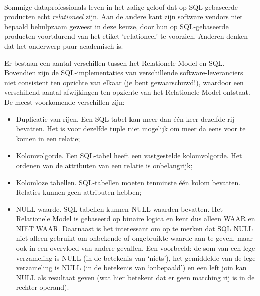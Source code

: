 \begin{aside}\mbox{}\\
Sommige dataprofessionals leven in het zalige geloof dat op SQL gebaseerde producten echt \textit{relationeel} zijn. Aan de andere kant zijn software vendors niet bepaald behulpzaam geweest in deze keuze, door hun op SQL-gebaseerde producten voortdurend van het etiket `relationeel' te voorzien. Anderen denken dat het onderwerp puur academisch is.

Er bestaan een aantal verschillen tussen het Relationele Model en SQL. Bovendien zijn de SQL-implementaties van verschillende software-leveranciers niet consistent ten opzichte van elkaar (je bent gewaarschuwd!), waardoor een verschillend aantal afwijkingen ten opzichte van het Relationele Model ontstaat. De meest voorkomende verschillen zijn:
\begin{itemize}
\item Duplicatie van rijen. Een SQL-tabel kan meer dan \'e\'en keer dezelfde rij bevatten. Het is voor dezelfde tuple niet mogelijk om meer da eens voor te komen in een relatie;
\item Kolomvolgorde. Een SQL-tabel heeft een vastgestelde kolomvolgorde. Het ordenen van de attributen van een relatie is onbelangrijk;
\item Kolomloze tabellen. SQL-tabellen moeten tenminste \'e\'en kolom bevatten. Relaties kunnen geen attributen hebben;
\item NULL-waarde. SQL-tabellen kunnen NULL-waarden bevatten. Het Relationele Model is gebaseerd op binaire logica en kent dus alleen WAAR en NIET WAAR. Daarnaast is het interessant om op te merken dat SQL NULL niet alleen gebruikt om onbekende of ongebruikte waarde aan te geven, maar ook in een overvloed van andere gevallen. Een voorbeeld: de som van een lege verzameling is NULL (in de betekenis van `niets'), het gemiddelde van de lege verzameling is NULL (in de betekenis van `onbepaald') en een left join kan NULL als resultaat geven (wat hier betekent dat er geen matching rij is in de rechter operand).
\end{itemize}
\end{aside}
